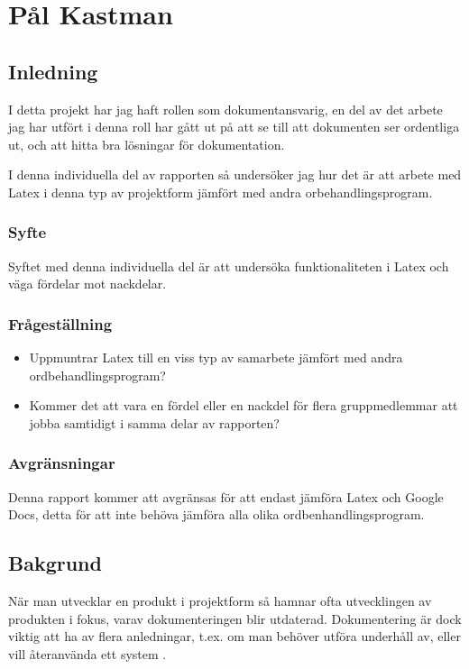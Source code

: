 \section{Pål Kastman}
\subsection{Inledning}
I detta projekt har jag haft rollen som dokumentansvarig, en del av det arbete jag har utfört i denna roll har gått ut på att se till att dokumenten ser ordentliga ut, och att hitta bra lösningar för dokumentation.

I denna individuella del av rapporten så undersöker jag hur det är att arbete med Latex i denna typ av projektform jämfört med andra orbehandlingsprogram.

\subsubsection{Syfte}
Syftet med denna individuella del är att undersöka funktionaliteten i Latex och väga fördelar mot nackdelar.

\subsubsection{Frågeställning}
\begin{itemize}
\item Uppmuntrar Latex till en viss typ av samarbete jämfört med andra ordbehandlingsprogram?
\item Kommer det att vara en fördel eller en nackdel för flera gruppmedlemmar att jobba samtidigt i samma delar av rapporten?
\end{itemize}

\subsubsection{Avgränsningar}
Denna rapport kommer att avgränsas för att endast jämföra Latex och Google Docs, detta för att inte behöva jämföra alla olika ordbenhandlingsprogram.

\subsection{Bakgrund}
När man utvecklar en produkt i projektform så hamnar ofta utvecklingen av produkten i fokus, varav dokumenteringen blir utdaterad. Dokumentering är dock viktig att ha av flera anledningar, t.ex. om man behöver utföra underhåll av, eller vill återanvända ett system \cite{m_spichkova}.

